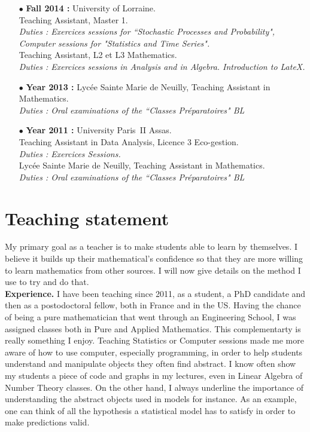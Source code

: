 \documentclass[a4paper]{article}
\begin{document}
\begin{itemize}
\item[$\bullet$] \textbf{ Fall 2014 :}  University of Lorraine.\\
					Teaching Assistant, Master 1. \\
					\textit{Duties : Exercices sessions for ``Stochastic Processes and Probability", Computer sessions for "Statistics and Time Series".}\\
					Teaching Assistant, L2 et L3 Mathematics. \\
					\textit{Duties : Exercices sessions in Analysis and in Algebra. Introduction to LateX.}\\
\item[$\bullet$] \textbf{ Year 2013 :} Lycée Sainte Marie de Neuilly, Teaching Assistant in Mathematics. \\
					\textit{Duties : Oral examinations of the ``Classes Préparatoires" BL} \\
\item[$\bullet$] \textbf{ Year 2011 :} University Paris~II Assas.\\
					Teaching Assistant in Data Analysis, Licence 3 Eco-gestion.\\
					\textit{Duties : Exercices Sessions.}\\
					Lycée Sainte Marie de Neuilly, Teaching Assistant in Mathematics. \\
					\textit{Duties : Oral examinations of the ``Classes Préparatoires" BL} 
\end{itemize}

\newpage

\section{Teaching statement}

My primary goal as a teacher is to make students able to learn by themselves. I believe it builds up their mathematical’s confidence so that they are more willing to learn mathematics from other sources. I will now give details  on the method I use to try and do that.\\

\textbf{Experience.} I have been teaching since 2011, as a student, a PhD candidate and then as a postodoctoral fellow, both in France and in the US. Having the chance of being a pure mathematician that went through an Engineering School, I was assigned classes both in Pure and Applied Mathematics. This complementarty is really something I enjoy. Teaching Statistics or Computer sessions made me more aware of how to use computer, especially programming, in order to help students understand and manipulate objects they often find abstract. I know often show my students a piece of code and graphs in my lectures, even in Linear Algebra of Number Theory classes. On the other hand, I always underline the importance of understanding the abstract objects used in models for instance. As an example, one can think of all the hypothesis a statistical model has to satisfy in order to make predictions valid.\\
\end{document}
